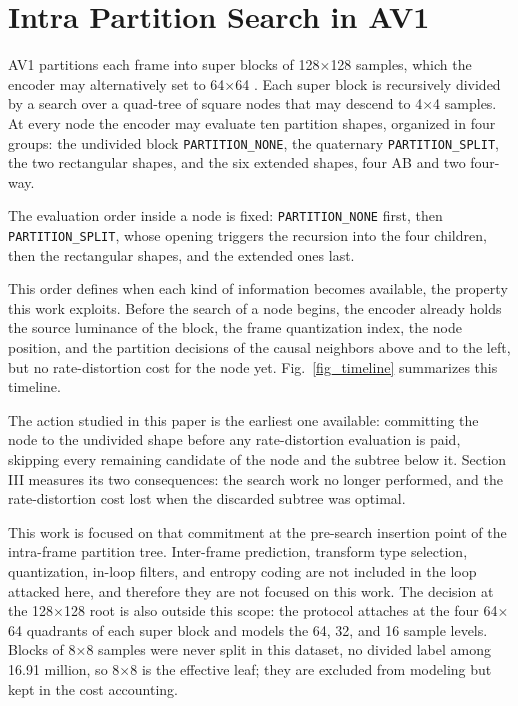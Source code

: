 \documentclass[conference]{IEEEtran}
\begin{document}
\section{Intra Partition Search in AV1}

AV1 partitions each frame into super blocks of 128$\times$128 samples, which the
encoder may alternatively set to 64$\times$64 \cite{han2021}. Each super block
is recursively divided by a search over a quad-tree of square nodes that may
descend to 4$\times$4 samples. At every node the encoder may evaluate ten
partition shapes, organized in four groups: the undivided block
\texttt{PARTITION\_NONE}, the quaternary \texttt{PARTITION\_SPLIT}, the two
rectangular shapes, and the six extended shapes, four AB and two four-way.

The evaluation order inside a node is fixed: \texttt{PARTITION\_NONE} first, then
\texttt{PARTITION\_SPLIT}, whose opening triggers the recursion into the four
children, then the rectangular shapes, and the extended ones last.

This order defines when each kind of information becomes available, the property
this work exploits. Before the search of a node begins, the encoder already
holds the source luminance of the block, the frame quantization index, the node
position, and the partition decisions of the causal neighbors above and to the
left, but no rate-distortion cost for the node yet. Fig.~\ref{fig_timeline}
summarizes this timeline.

The action studied in this paper is the earliest one available: committing the
node to the undivided shape before any rate-distortion evaluation is paid,
skipping every remaining candidate of the node and the subtree below it. Section
III measures its two consequences: the search work no longer performed, and the
rate-distortion cost lost when the discarded subtree was optimal.

This work is focused on that commitment at the pre-search insertion point of the
intra-frame partition tree. Inter-frame prediction, transform type selection,
quantization, in-loop filters, and entropy coding are not included in the loop
attacked here, and therefore they are not focused on this work. The decision at
the 128$\times$128 root is also outside this scope: the protocol attaches at the
four 64$\times$64 quadrants of each super block and models the 64, 32, and 16
sample levels. Blocks of 8$\times$8 samples were never split in this dataset, no
divided label among 16.91 million, so 8$\times$8 is the effective leaf; they are
excluded from modeling but kept in the cost accounting.
\end{document}
